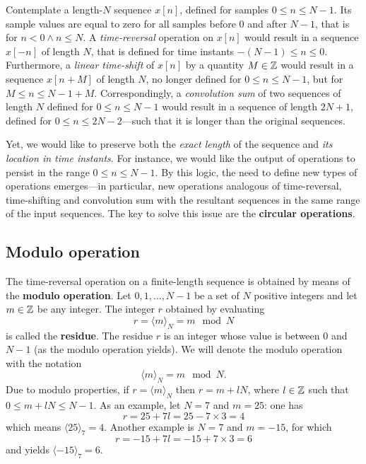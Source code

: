 \documentclass[\documentfontsize, twocolumn]{\classname}
\begin{document}
Contemplate a length-$N$ sequence $x[n]$, defined for samples $0\leq n \leq N-1$. Its sample values are equal to zero for all samples before $0$ and after $N-1$, that is for $n < 0 \wedge n \leq N$. A \emph{time-reversal} operation on $x[n]$ would result in a sequence $x[-n]$ of length $N$, that is defined for time instants $-(N-1) \leq n \leq 0$. Furthermore, a \emph{linear time-shift} of $x[n]$ by a quantity $M \in \mathbb Z$ would result in a sequence $x[n+M]$ of length $N$, no longer defined for $0 \leq n \leq N-1$, but for $M \leq n \leq N-1 + M$. Correspondingly, a \emph{convolution sum} of two sequences of length $N$ defined for $0 \leq n \leq N-1$ would result in a sequence of length $2N + 1$, defined for $0 \leq n \leq 2N-2$---such that it is longer than the original sequences.

Yet, we would like to preserve both the \emph{exact length} of the sequence and \emph{its location in time instants}. For instance, we would like the output of operations to persist in the range $0 \leq n \leq N-1$. By this logic, the need to define new types of operations emerges---in particular, new operations analogous of time-reversal, time-shifting and convolution sum with the resultant sequences in the same range of the input sequences. The key to solve this issue are the \textbf{circular operations}.

\subsection{Modulo operation}
The time-reversal operation on a finite-length sequence is obtained by means of the \textbf{modulo operation}. Let $0,1,\dots, N-1$ be a set of $N$ positive integers and let $m \in \mathbb Z$ be any integer. The integer $r$ obtained by evaluating
\begin{equation}\label{eqn:moduloOperation}
    r = \langle m \rangle_N = m \mod N
\end{equation}
is called the \textbf{residue}. The residue $r$ is an integer whose value is between $0$ and $N-1$ (as the modulo operation yields). We will denote the modulo operation with the notation \[ \langle m \rangle_N = m \mod N. \] Due to modulo properties, if $r = \langle m \rangle_N$ then $r = m + lN$, where $l \in \mathbb Z$ such that $0 \leq m + lN \leq N-1$.
As an example, let $N=7$ and $m = 25$: one has 
\[
    r = 25 + 7l = 25 - 7 \times 3 = 4
\]
which means $\langle 25 \rangle_7 = 4$. Another example is $N=7$ and $m=-15$, for which
\[
    r = -15 + 7l = -15 + 7 \times 3 = 6
\]
and yields $\langle -15 \rangle_7 = 6$.
\end{document}
